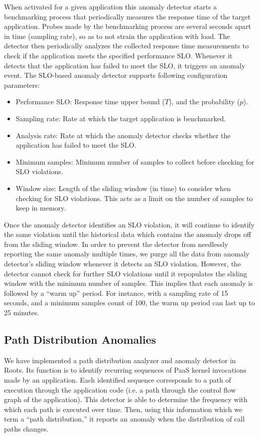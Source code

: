 When activated for a given application this anomaly detector starts a benchmarking process
that periodically measures the response time of the target application. Probes made by the benchmarking 
process are several seconds apart in time (sampling rate), so as to not strain the application with load.
The detector then periodically
analyzes the collected response time measurements to check if the application meets the specified performance
SLO. Whenever it detects that the application has failed to meet the SLO, it triggers an anomaly event. 
The SLO-based anomaly detector supports following configuration parameters:
\begin{itemize}
\item Performance SLO: Response time upper bound ($T$), and the probability ($p$).
\item Sampling rate: Rate at which the target application is benchmarked.
\item Analysis rate: Rate at which the anomaly detector checks whether the application has failed to meet the SLO.
\item Minimum samples: Minimum number of samples to collect before checking for SLO violations.
\item Window size: Length of the sliding window (in time) to consider when checking for SLO violations. This
acts as a limit on the number of samples to keep in memory.
\end{itemize}

Once the anomaly detector identifies an SLO violation, it will continue to 
identify the same violation
until the historical data which contains the anomaly drops off from the sliding window. 
In order to prevent the detector from needlessly reporting the same anomaly multiple times,
we purge all the data from anomaly detector's sliding window whenever it detects an SLO violation.
However, the detector cannot check for further SLO violations until it repopulates the sliding window 
with the minimum number of samples. This implies that each anomaly is followed by a ``warm up'' period.
For instance, with a sampling rate of 15 seconds, and a minimum
samples count of 100, the warm up period can last up to 25 minutes.

\subsection{Path Distribution Anomalies}

We have implemented a path distribution analyzer and anomaly
detector in Roots. Its function is to identify recurring sequences of
PaaS kernel invocations made by an application.
Each identified sequence corresponds to a path of
execution through the application code (i.e. a path through the control flow graph of the application). 
This detector is able to determine the frequency with
which each path is executed over time. Then, using this information which we term
a ``path distribution,'' it reports an anomaly when the distribution of call paths
changes. 

